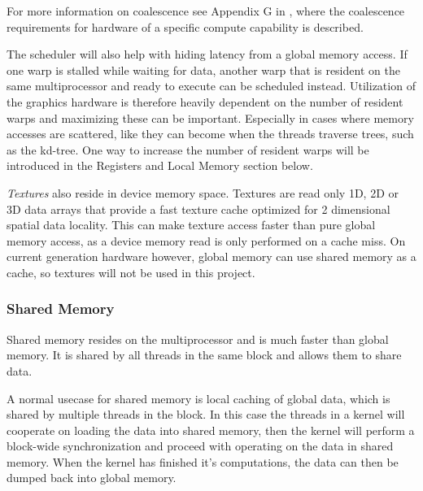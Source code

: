 For more information on coalescence see Appendix G in , where
the coalescence requirements for hardware of a specific compute capability is
described.


The scheduler will also help with hiding latency from a global memory access. If
one warp is stalled while waiting for data, another warp that is resident on the
same multiprocessor and ready to execute can be scheduled instead. Utilization
of the graphics hardware is therefore heavily dependent on the number of
resident warps and maximizing these can be important. Especially in cases where
memory accesses are scattered, like they can become when the threads traverse
trees, such as the kd-tree. One way to increase the number of resident warps
will be introduced in the Registers and Local Memory section below.


\textit{Textures} also reside in device memory space. Textures are read only 1D,
2D or 3D data arrays that provide a fast texture cache optimized for 2
dimensional spatial data locality. This can make texture access faster than pure
global memory access, as a device memory read is only performed on a cache
miss. On current generation hardware however, global memory can use shared
memory as a cache, so textures will not be used in this project.

\subsubsection{Shared Memory}


Shared memory resides on the multiprocessor and is much faster than global
memory. It is shared by all threads in the same block and allows them to share
data.


A normal usecase for shared memory is local caching of global data, which is
shared by multiple threads in the block. In this case the threads in a kernel
will cooperate on loading the data into shared memory, then the kernel will
perform a block-wide synchronization and proceed with operating on the data in
shared memory. When the kernel has finished it's computations, the data can then
be dumped back into global memory.

